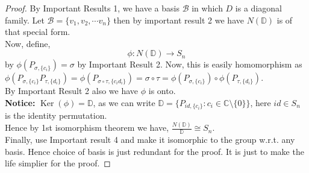 \documentclass{article}
\theoremstyle{definition}
\theoremstyle{remark}
\begin{document}
    \begin{proof}
        By Important Results 1, we have a basis $\mathcal{B}$ in which $D$ is a diagonal family. Let $\mathcal{B}=\{v_1,v_2,\cdots v_n\}$ then by important result 2 
        we have $N(\mathbb{D})$ is of that special form.\\
        Now, define,
        $$\phi : N(\mathbb{D})\rightarrow S_n$$ by $\phi(P_{\sigma,\{c_i\}})=\sigma$
        by Important Result 2. Now, this is easily homomorphism as $\phi(P_{\sigma,\{c_i\}}P_{\tau,\{d_i\}})=\phi (P_{\sigma \circ \tau,\{c_id_i\}})=\sigma \circ \tau = \phi(P_{\sigma,\{c_i\}}) \circ \phi(P_{\tau,\{d_i\}})$.\\

        By Important Result 2 also we have $\phi$ is onto. \\

        \textbf{Notice:} $\operatorname{Ker}(\phi)=\mathbb{D}$, as we can write $\mathbb{D}=\{P_{id,\{c_i\}}: c_i\in \mathbb{C}\setminus \{0\}\}$, here $id \in S_n$ is the identity permutation.\\

        Hence by 1st isomorphism theorem we have, $\frac{N(\mathbb{D})}{\mathbb{D}}\cong S_n$.\\

        Finally, use Important result 4 and make it isomorphic to the group w.r.t. any basis. Hence choice of basis is just redundant for the proof. It is just to make the life simplier for the proof.
    \end{proof}
\end{document}
